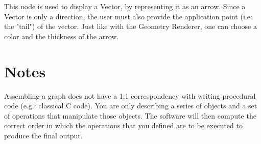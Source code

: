 This node is used to display a Vector, by representing it as an arrow.
Since a Vector is only a direction, the user must also provide the application point (i.e: the "tail") of the vector.
Just like with the Geometry Renderer, one can choose a color and the thickness of the arrow.

\section{Notes}
Assembling a graph does not have a 1:1 correspondency with writing procedural
code (e.g.: classical C code). You are only describing a series of
objects and a set of operations that manipulate those objects. The software
will then compute the correct order in which the operations that you defined
are to be executed to produce the final output.

